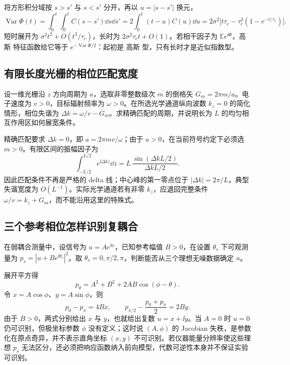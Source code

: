 将方形积分域按 \(s>s'\) 与 \(s<s'\) 分开，再以 \(u=|s-s'|\) 换元，
\[
\operatorname{Var}\Phi(t)=
\int_0^t\!\int_0^t C(s-s')\dd s\dd s'
=2\int_0^t(t-u)C(u)\dd u
=2\sigma^2\bigl[t\tau_c-\tau_c^2(1-e^{-t/\tau_c})\bigr].
\]
短时展开为 \(\sigma^2t^2+O(t^3/\tau_c)\)，长时为 \(2\sigma^2\tau_ct+O(1)\)。若相干因子为 \(\mathbb E e^{\ii\Phi}\)，高斯 特征函数给它等于 \(e^{-\operatorname{Var}\Phi/2}\)：起初是 高斯 型，只有长时才是近似指数型。

\subsection*{有限长度光栅的相位匹配宽度}
设一维光栅沿 \(z\) 方向周期为 \(a\)，选取非零整数级次 \(m\) 的倒格矢 \(G_m=2\pi m/a\)。电子速度为 \(v>0\)，目标辐射频率为 \(\omega>0\)。在所选光学通道纵向波数 \(k_z=0\) 的简化情形，相位失谐为 \(\Delta k=\omega/v-G_m\)。求精确匹配的周期，并说明长为 \(L\) 的均匀相互作用区如何展宽条件。

精确匹配要求 \(\Delta k=0\)，即 \(a=2\pi mv/\omega\)；由于 \(a>0\)，在当前符号约定下必须选 \(m>0\)。有限区间的振幅因子为
\[
\int_{-L/2}^{L/2}e^{\ii\Delta k z}\dd z
=L\,\frac{\sin(\Delta kL/2)}{\Delta kL/2}.
\]
因此匹配条件不再是严格的 delta 线；中心峰的第一零点位于 \(|\Delta k|=2\pi/L\)，典型失谐宽度为 \(O(L^{-1})\)。实际光学通道若有非零 \(k_z\)，应退回完整条件 \(\omega/v=k_z+G_m\)，而不能沿用这里的特殊式。

\subsection*{三个参考相位怎样识别复耦合}
在弱耦合测量中，设信号为 \(u=Ae^{\ii\phi}\)，已知参考幅值 \(B>0\)，在设置 \(\theta_s\) 下可观测量为 \(p_s=|u+Be^{\ii\theta_s}|^2\)。取 \(\theta_s=0,\pi/2,\pi\)，判断能否从三个理想无噪数据确定 \(u\)。

展开平方得
\[
p_\theta=A^2+B^2+2AB\cos(\phi-\theta).
\]
令 \(x=A\cos\phi\)、\(y=A\sin\phi\)，则
\[
p_0-p_\pi=4Bx,\qquad
p_{\pi/2}-\frac{p_0+p_\pi}{2}=2By.
\]
由于 \(B>0\)，两式分别给出 \(x\) 与 \(y\)，也就给出复数 \(u=x+\ii y\)。当 \(A=0\) 时 \(u=0\) 仍可识别，但极坐标参数 \(\phi\) 没有定义；这时说 \((A,\phi)\) 的 Jacobian 失秩，是参数化在原点奇异，并不表示直角坐标 \((x,y)\) 不可识别。若仪器能量分辨率使这些理想 \(p_s\) 无法区分，还必须把响应函数纳入前向模型，代数可逆性本身并不保证实验可识别。
